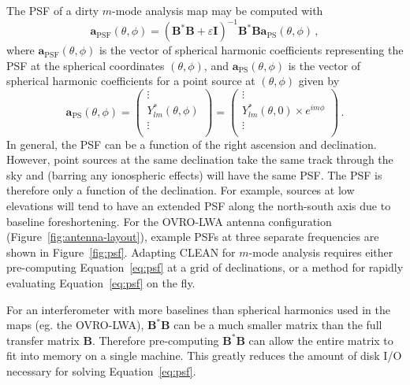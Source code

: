 \documentclass[twocolumn]{aastex61}
\renewcommand{\b}{\pmb}
\begin{document}
The PSF of a dirty $m$-mode analysis map may be computed with
\begin{equation}\label{eq:psf}
    \b a_\text{PSF}(\theta, \phi)
        = (\b B^*\b B + \varepsilon\b I)^{-1}\b B^*\b B\b a_\text{PS}(\theta, \phi)\,,
\end{equation}
where $\b a_\text{PSF}(\theta, \phi)$ is the vector of spherical harmonic coefficients representing
the PSF at the spherical coordinates $(\theta, \phi)$, and $\b a_\text{PS}(\theta, \phi)$ is the
vector of spherical harmonic coefficients for a point source at $(\theta, \phi)$ given by
\begin{equation}
    \b a_\text{PS}(\theta, \phi) = \begin{pmatrix}
        \vdots \\
        Y_{lm}^*(\theta, \phi) \\
        \vdots \\
    \end{pmatrix}
    = \begin{pmatrix}
        \vdots \\
        Y_{lm}^*(\theta, 0)\times e^{im\phi} \\
        \vdots \\
    \end{pmatrix} \,.
\end{equation}
In general, the PSF can be a function of the right ascension and declination. However, point sources
at the same declination take the same track through the sky and (barring any ionospheric effects)
will have the same PSF. The PSF is therefore only a function of the declination. For example,
sources at low elevations will tend to have an extended PSF along the north-south axis due to
baseline foreshortening. For the OVRO-LWA antenna configuration (Figure~\ref{fig:antenna-layout}),
example PSFs at three separate frequencies are shown in Figure~\ref{fig:psf}.  Adapting CLEAN for
$m$-mode analysis requires either pre-computing Equation~\ref{eq:psf} at a grid of declinations, or
a method for rapidly evaluating Equation~\ref{eq:psf} on the fly.

For an interferometer with more baselines than spherical harmonics used in the maps (eg. the
OVRO-LWA), $\b B^*\b B$ can be a much smaller matrix than the full transfer matrix $\b B$. Therefore
pre-computing $\b B^*\b B$ can allow the entire matrix to fit into memory on a single machine. This
greatly reduces the amount of disk I/O necessary for solving Equation~\ref{eq:psf}.
\end{document}
